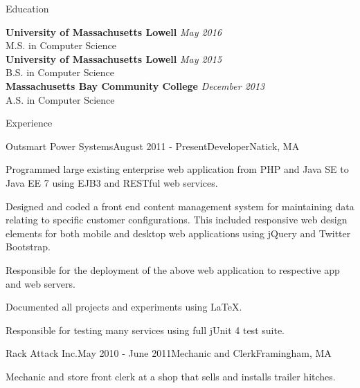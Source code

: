 \documentclass{resume} %
\begin{document}

\begin{rSection}{Education}

{\bf University of Massachusetts Lowell} \hfill {\em May 2016} \\ 
M.S. in Computer Science  \smallskip \\
{\bf University of Massachusetts Lowell} \hfill {\em May 2015} \\ 
B.S. in Computer Science  \smallskip \\
{\bf Massachusetts Bay Community College} \hfill {\em December 2013} \\ 
A.S. in Computer Science  \smallskip \\

\end{rSection}


\begin{rSection}{Experience}


\begin{rSubsection}{Outsmart Power Systems}{August 2011 - Present}{Developer}{Natick, MA}
\item Programmed large existing enterprise web application from PHP and Java SE to Java EE 7 using EJB3 and RESTful web services.
\item Designed and coded a front end content management system for maintaining data relating to specific customer configurations. This included responsive web design elements for both mobile and desktop web applications using jQuery and Twitter Bootstrap.
\item Responsible for the deployment of the above web application to respective app and web servers.
\item Documented all projects and experiments using \LaTeX.
\item Responsible for testing many services using full jUnit 4 test suite.
\end{rSubsection}


\begin{rSubsection}{Rack Attack Inc.}{May 2010 - June 2011}{Mechanic and Clerk}{Framingham, MA}
\item Mechanic and store front clerk at a shop that sells and installs trailer hitches.
\end{rSubsection}


\end{rSection}
\end{document}
